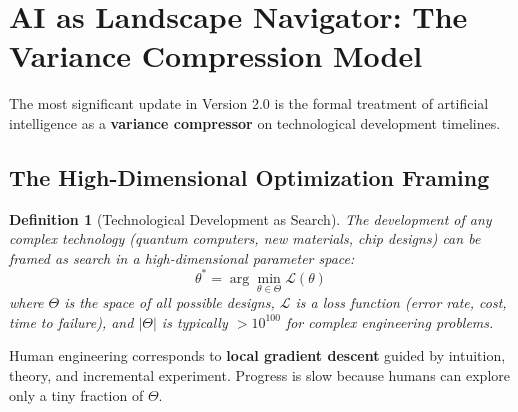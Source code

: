 \documentclass[11pt,a4paper]{article}
\newtheorem{definition}[theorem]{Definition}
\begin{document}
\section{AI as Landscape Navigator: The Variance Compression Model}

The most significant update in Version 2.0 is the formal treatment of artificial intelligence as a \textbf{variance compressor} on technological development timelines.

\subsection{The High-Dimensional Optimization Framing}

\begin{definition}[Technological Development as Search]
The development of any complex technology (quantum computers, new materials, chip designs) can be framed as search in a high-dimensional parameter space:
\begin{equation}
\theta^* = \arg\min_{\theta \in \Theta} \mathcal{L}(\theta)
\end{equation}
where $\Theta$ is the space of all possible designs, $\mathcal{L}$ is a loss function (error rate, cost, time to failure), and $|\Theta|$ is typically $>10^{100}$ for complex engineering problems.
\end{definition}

Human engineering corresponds to \textbf{local gradient descent} guided by intuition, theory, and incremental experiment. Progress is slow because humans can explore only a tiny fraction of $\Theta$.
\end{document}

